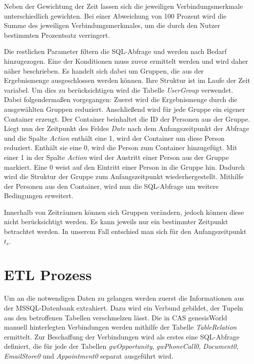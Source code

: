Neben der Gewichtung der Zeit lassen sich die jeweiligen Verbindungsmerkmale unterschiedlich gewichten. Bei einer Abweichung von 100 Prozent wird die Summe des jeweiligen Verbindungsmerkmales, um die durch den Nutzer bestimmten Prozentsatz verringert. 

Die restlichen Parameter filtern die SQL-Abfrage und werden nach Bedarf hinzugezogen. Eine der Konditionen muss zuvor ermittelt werden und wird daher näher beschrieben. Es handelt sich dabei um Gruppen, die aus der Ergebnismenge ausgeschlossen werden können. Ihre Struktur ist im Laufe der Zeit variabel. Um dies zu berücksichtigen wird die Tabelle \textit{UserGroup} verwendet. Dabei folgendermaßen vorgegangen: Zuerst wird die Ergebnismenge durch die ausgewählten Gruppen reduziert. Anschließend wird für jede Gruppe ein eigener Container erzeugt. Der Container beinhaltet die ID der Personen aus der Gruppe. Liegt nun der Zeitpunkt des Feldes \textit{Date} nach dem Anfangszeitpunkt der Abfrage und die Spalte \textit{Action} enthält eine 1, wird der Container um diese Person reduziert. Enthält sie eine 0, wird die Person zum Container hinzugefügt. Mit einer 1 in der Spalte \textit{Action} wird der Austritt einer Person aus der Gruppe markiert. Eine 0 weist auf den Eintritt einer Person in die Gruppe hin. Dadurch wird die Struktur der Gruppe zum Anfangszeitpunkt wiederhergestellt. Mithilfe der Personen aus den Container, wird nun die SQL-Abfrage um weitere Bedingungen erweitert.

Innerhalb von Zeiträumen können sich Gruppen verändern, jedoch können diese nicht berücksichtigt werden. Es kann jeweils nur ein bestimmter Zeitpunkt betrachtet werden. In unserem Fall entschied man sich für den Anfangszeitpunkt $t_{s}$.

\section{ETL Prozess}

Um an die notwendigen Daten zu gelangen werden zuerst die Informationen aus der MSSQL-Datenbank extrahiert. Dazu wird ein Verbund gebildet, der Tupeln aus den betroffenen Tabellen verschmelzen lässt. Die in CAS genesisWorld manuell hinterlegten Verbindungen werden mithilfe der Tabelle \textit{TableRelation} ermittelt. Zur Beschaffung der Verbindungen wird als erstes eine SQL-Abfrage definiert, die für jede der Tabellen \textit{gwOpportunity}, \textit{gwPhoneCall0}, \textit{Document0}, \textit{EmailStore0} und \textit{Appointment0} separat ausgeführt wird. 

